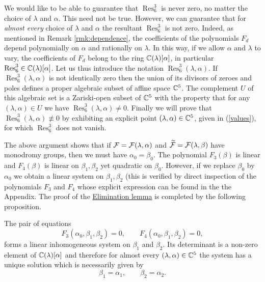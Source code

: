 We would like to be able to guarantee that $\operatorname{Res}^3_6$ is never zero, no matter the choice of $\lambda$ and $\alpha$. This need not be true. However, we can guarantee that for \emph{almost every} choice of $\lambda$ and $\alpha$ the resultant $\operatorname{Res}^3_6$ is not zero. Indeed, as mentioned in Remark \ref{rmk:dependence}, the coefficients of the polynomials $F_d$ depend polynomially on $\alpha$ and rationally on $\lambda$. In this way, if we allow $\alpha$ and $\lambda$ to vary, the coefficients of $F_d$ belong to the ring $\mathbb{C}(\lambda)[\alpha]$, in particular $\operatorname{Res}^3_6\in\mathbb{C}(\lambda)[\alpha]$. Let us thus introduce the notation $\operatorname{Res}^3_6(\lambda,\alpha)$. If $\operatorname{Res}^3_6(\lambda,\alpha)$ is not identically zero then the union of its divisors of zeroes and poles defines a proper algebraic subset of affine space $\mathbb{C}^5$. The complement $U$ of this algebraic set is a Zariski-open subset of $\mathbb{C}^5$ with the property that for any $(\lambda,\alpha)\in U$ we have $\operatorname{Res}^3_6(\lambda,\alpha)\neq 0$. Finally we will prove that $\operatorname{Res}^3_6(\lambda,\alpha)\not\equiv 0$ by exhibiting an explicit point $(\lambda,\alpha)\in\mathbb{C}^5$, given in (\ref{values}), for which $\operatorname{Res}^3_6$ does not vanish. 

The above argument shows that if $\mathcal{F}=\mathcal{F}(\lambda,\alpha)$ and $\widetilde{\mathcal{F}}=\mathcal{F}(\lambda,\beta)$ have  monodromy groups, then we must have $\alpha_0=\beta_0$. The polynomial $F_3(\beta)$ is linear and $F_4(\beta)$ is linear on $\beta_1,\beta_2$ yet quadratic on $\beta_0$. However, if we replace $\beta_0$ by $\alpha_0$ we obtain a linear system on $\beta_1,\beta_2$ (this is verified by direct inspection of the polynomials $F_3$ and $F_4$ whose explicit expression can be found in the the Appendix. %
The proof of the \hyperref[lemma:elimination]{Elimination lemma} is completed by the following proposition.

\begin{proposition}\label{prop:elimination2}
The pair of equations
\begin{equation}\label{eq:elimination2}
F_3(\alpha_0,\beta_1,\beta_2)=0,\qquad F_4(\alpha_0,\beta_1,\beta_2)=0,
\end{equation}
forms a linear inhomogeneous system on $\beta_1$ and $\beta_2$. Its determinant is a non-zero element of $\mathbb{C}(\lambda)[\alpha]$ and therefore for almost every $(\lambda,\alpha)\in\mathbb{C}^5$ the system has a unique solution which is necessarily given by 
\[ \beta_1=\alpha_1, \qquad \beta_2=\alpha_2. \]
\end{proposition}

